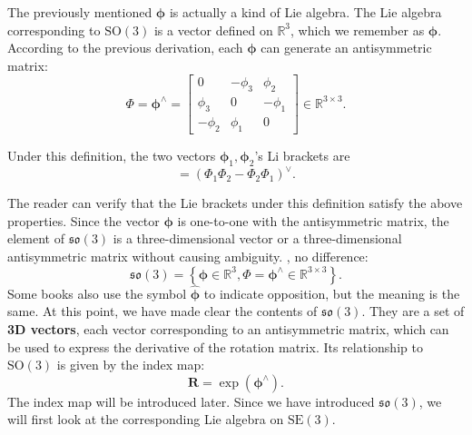           The previously mentioned $\boldsymbol{\phi}$ is actually a kind of Lie algebra. The Lie algebra corresponding to $\mathrm{SO}(3)$ is a vector defined on $\mathbb{R}^3$, which we remember as $\boldsymbol{\phi}$. According to the previous derivation, each $\boldsymbol{\phi}$ can generate an antisymmetric matrix:
          \begin{equation}
          \label{eq:phi}
          \boldsymbol{\varPhi} = \boldsymbol{\phi}^{\wedge} = \left[ {\begin{array}{*{20}{c}}
            0&{ - {\phi _3}}&{{\phi _2}}\\
            {{\phi _3}}&0&{ - {\phi _1}}\\
            { - {\phi _2}}&{{\phi _1}}&0
            \end{array}} \right] \in \mathbb{R}^{3 \times 3}.
            \end{equation}

            Under this definition, the two vectors $\boldsymbol{\phi}_1, \boldsymbol{\phi}_2$'s Li brackets are
            \begin{equation}
            [\boldsymbol{\phi}_1, \boldsymbol{\phi}_2] = \left( \bm{ \varPhi }_1 \bm{ \varPhi }_2 - \bm{ \varPhi }_2 \bm{ \varPhi }_1 \right)^\vee.
            \end{equation}

            The reader can verify that the Lie brackets under this definition satisfy the above properties. Since the vector $\boldsymbol{\phi}$ is one-to-one with the antisymmetric matrix, the element of $\mathfrak{so}(3)$ is a three-dimensional vector or a three-dimensional antisymmetric matrix without causing ambiguity. , no difference:
            \begin{equation}
            \mathfrak{so}(3) = \left\{ \boldsymbol{\phi} \in \mathbb{R}^3, \boldsymbol{\varPhi} = \boldsymbol{\phi^\wedge} \in \mathbb{ R}^{3 \times 3} \right\}.
            \end{equation}
            Some books also use the symbol $\widehat{\boldsymbol{\phi}}$ to indicate opposition, but the meaning is the same. At this point, we have made clear the contents of $\mathfrak{so}(3)$. They are a set of \textbf{3D vectors}, each vector corresponding to an antisymmetric matrix, which can be used to express the derivative of the rotation matrix. Its relationship to $\mathrm{SO}(3)$ is given by the index map:
            \begin{equation}
            \bm{R} = \exp ( \boldsymbol{\phi}^\wedge ).
            \end{equation}
            The index map will be introduced later. Since we have introduced $\mathfrak{so}(3)$, we will first look at the corresponding Lie algebra on $\mathrm{SE}(3)$.

